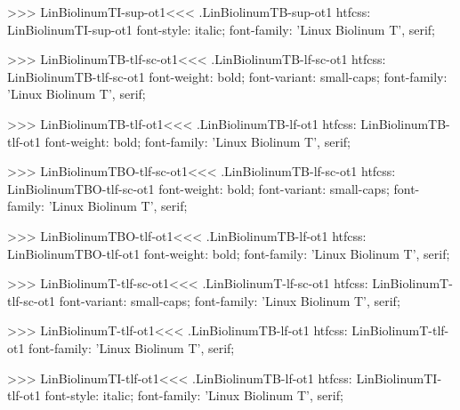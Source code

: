 {{{>>>
\<LinBiolinumTI-sup-ot1\><<<
.LinBiolinumTB-sup-ot1
htfcss:  LinBiolinumTI-sup-ot1  font-style: italic; font-family: 'Linux Biolinum T', serif;

>>>
\<LinBiolinumTB-tlf-sc-ot1\><<<
.LinBiolinumTB-lf-sc-ot1
htfcss:  LinBiolinumTB-tlf-sc-ot1  font-weight: bold; font-variant: small-caps; font-family: 'Linux Biolinum T', serif;

>>>
\<LinBiolinumTB-tlf-ot1\><<<
.LinBiolinumTB-lf-ot1
htfcss:  LinBiolinumTB-tlf-ot1  font-weight: bold; font-family: 'Linux Biolinum T', serif;

>>>
\<LinBiolinumTBO-tlf-sc-ot1\><<<
.LinBiolinumTB-lf-sc-ot1
htfcss:  LinBiolinumTBO-tlf-sc-ot1  font-weight: bold; font-variant: small-caps; font-family: 'Linux Biolinum T', serif;

>>>
\<LinBiolinumTBO-tlf-ot1\><<<
.LinBiolinumTB-lf-ot1
htfcss:  LinBiolinumTBO-tlf-ot1  font-weight: bold; font-family: 'Linux Biolinum T', serif;

>>>
\<LinBiolinumT-tlf-sc-ot1\><<<
.LinBiolinumT-lf-sc-ot1
htfcss:  LinBiolinumT-tlf-sc-ot1  font-variant: small-caps; font-family: 'Linux Biolinum T', serif;

>>>
\<LinBiolinumT-tlf-ot1\><<<
.LinBiolinumTB-lf-ot1
htfcss:  LinBiolinumT-tlf-ot1  font-family: 'Linux Biolinum T', serif;

>>>
\<LinBiolinumTI-tlf-ot1\><<<
.LinBiolinumTB-lf-ot1
htfcss:  LinBiolinumTI-tlf-ot1  font-style: italic; font-family: 'Linux Biolinum T', serif;

}}}
